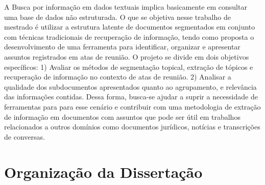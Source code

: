 A Busca por informação em dados textuais implica basicamente em consultar uma base de dados não estruturada. O que se objetiva nesse trabalho de mestrado é utilizar a estrutura latente de documentos segmentados em conjunto com técnicas tradicionais de recuperação de informação, tendo como 
proposta o desenvolvimento de uma ferramenta para identificar, organizar e apresentar assuntos registrados em atas de reunião. O projeto se divide em dois objetivos específicos: 1) Avaliar os métodos de segmentação topical, extração de tópicos e recuperação de informação no contexto de atas de reunião. 2) Analisar a qualidade dos subdocumentos apresentados quanto ao agrupamento, e relevância das informações contidas.
Dessa forma, busca-se ajudar a suprir a necessidade de ferramentas para para esse cenário e contribuir com uma metodologia de extração de informação em documentos com assuntos que pode ser útil em trabalhos relacionados a outros domínios como documentos jurídicos, notícias e transcrições de conversas.











\section{Organização da Dissertação}






